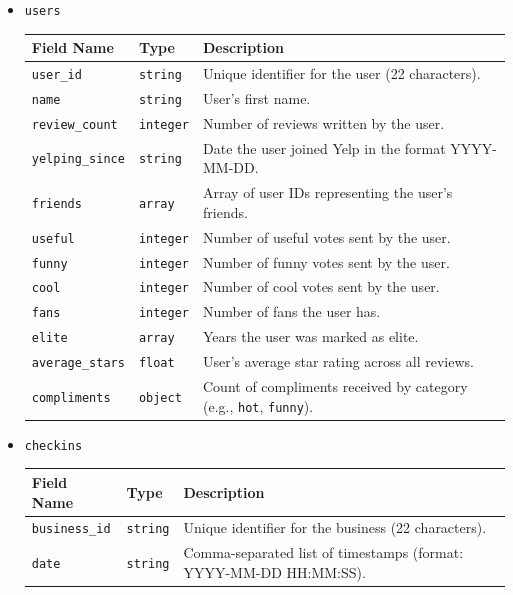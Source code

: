 \documentclass{Configuration_Files/PoliMi3i_thesis}
\begin{document}
\begin{itemize}
\item{\texttt{users}}
\begin{longtable}{|p{3cm}|p{2.5cm}|p{10cm}|}
\hline
\textbf{Field Name} & \textbf{Type} & \textbf{Description} \\ \hline
\texttt{user\_id} & \texttt{string} & Unique identifier for the user (22 characters). \\ \hline
\texttt{name} & \texttt{string} & User's first name. \\ \hline
\texttt{review\_count} & \texttt{integer} & Number of reviews written by the user. \\ \hline
\texttt{yelping\_since} & \texttt{string} & Date the user joined Yelp in the format YYYY-MM-DD. \\ \hline
\texttt{friends} & \texttt{array} & Array of user IDs representing the user's friends. \\ \hline
\texttt{useful} & \texttt{integer} & Number of useful votes sent by the user. \\ \hline
\texttt{funny} & \texttt{integer} & Number of funny votes sent by the user. \\ \hline
\texttt{cool} & \texttt{integer} & Number of cool votes sent by the user. \\ \hline
\texttt{fans} & \texttt{integer} & Number of fans the user has. \\ \hline
\texttt{elite} & \texttt{array} & Years the user was marked as elite. \\ \hline
\texttt{average\_stars} & \texttt{float} & User's average star rating across all reviews. \\ \hline
\texttt{compliments} & \texttt{object} & Count of compliments received by category (e.g., \texttt{hot}, \texttt{funny}). \\ \hline
\end{longtable}

\item{\texttt{checkins}}
\begin{longtable}{|p{3cm}|p{2.5cm}|p{10cm}|}
\hline
\textbf{Field Name} & \textbf{Type} & \textbf{Description} \\ \hline
\texttt{business\_id} & \texttt{string} & Unique identifier for the business (22 characters). \\ \hline
\texttt{date} & \texttt{string} & Comma-separated list of timestamps (format: YYYY-MM-DD HH:MM:SS). \\ \hline
\end{longtable}

\end{itemize}
\end{document}
